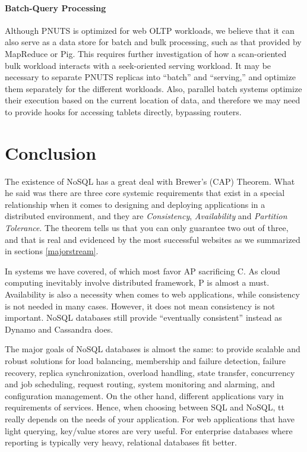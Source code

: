 \documentclass[12pt,letter]{article}
\begin{document}
\paragraph*{Batch-Query Processing}
Although PNUTS is optimized for web OLTP workloads, we believe that it can also serve as a data store for batch and bulk processing, such as that provided by MapReduce or Pig. This requires further investigation of how a scan-oriented bulk workload interacts with a seek-oriented serving workload. It may be necessary to separate PNUTS replicas into ``batch'' and ``serving,'' and optimize them separately for the different workloads. Also, parallel batch systems optimize their execution based on the current location of data, and therefore we may need to provide hooks for accessing tablets directly, bypassing routers.

\section{Conclusion}
The existence of NoSQL has a great deal with Brewer's (CAP) Theorem.\citep{Browne2009} What he said was there are three core systemic requirements that exist in a special relationship when it comes to designing and deploying applications in a distributed environment, and they are \textit{Consistency}, \textit{Availability} and \textit{Partition Tolerance}. The theorem tells us that you can only guarantee two out of three, and that is real and evidenced by the most successful websites as we summarized in sections \ref{majorstream}.

In systems we have covered, of which most favor AP sacrificing C. As cloud computing inevitably involve distributed framework, P is almost a must. Availability is also a necessity when comes to web applications, while consistency is not needed in many cases. However, it does not mean consistency is not important. NoSQL databases still provide ``eventually consistent'' instead as Dynamo and Cassandra does. 

The major goals of NoSQL databases is almost the same: to provide scalable and robust solutions for load balancing, membership and failure detection, failure recovery, replica synchronization, overload handling, state transfer, concurrency and job scheduling, request routing, system monitoring and alarming, and configuration management. On the other hand, different applications vary in requirements of services. Hence, when choosing between SQL and NoSQL, tt really depends on the needs of your application. For web applications that have light querying, key/value stores are very useful. For enterprise databases where reporting is typically very heavy, relational databases fit better. 


\end{document}

